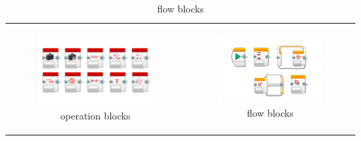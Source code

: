 \documentclass[11 pt,t]{beamer}
\begin{document}
\begin{frame}
\begin{table}[h!]
\begin{center}
\begin{tabular}{cc}
      \begin{subfigure}{0.5\textwidth}\centering\caption{operation blocks}\includegraphics[width=\textwidth]{images/LearnToProgram_operations_blocks_landscape.png}\end{subfigure}&
      \begin{subfigure}{0.5\textwidth}\centering\caption{flow blocks}\includegraphics[width=\textwidth]{images/LearnToProgram_flow_blocks_landscape.png}\end{subfigure}\\
      \end{tabular}
      \end{center}
    \end{table}
\end{frame}
\end{document}
